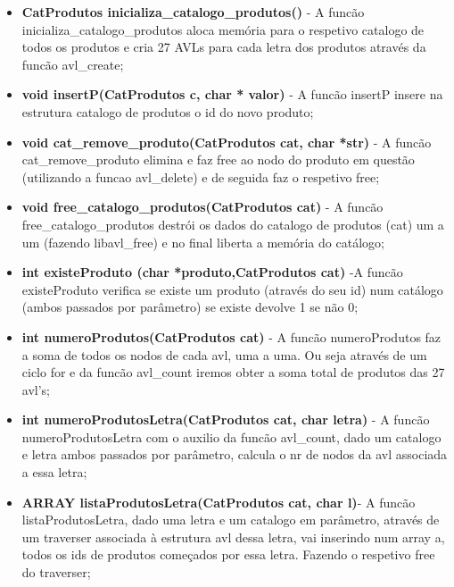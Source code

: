\begin{itemize}
	
\item \textbf{CatProdutos inicializa\_catalogo\_produtos()} - A funcão inicializa\_catalogo\_produtos aloca memória para o respetivo catalogo de todos os produtos e cria 27 AVLs para cada letra dos produtos através da funcão avl\_create; 

\item \textbf{void insertP(CatProdutos c, char * valor)} - A funcão insertP insere na estrutura catalogo de produtos o id do novo produto; 

\item \textbf{void cat\_remove\_produto(CatProdutos cat, char *str)} - A funcão cat\_remove\_produto elimina e faz free ao nodo do produto em questão (utilizando a funcao avl\_delete) e de seguida faz o respetivo free; 

\item \textbf{void free\_catalogo\_produtos(CatProdutos cat)} - A funcão free\_catalogo\_produtos destrói os dados do catalogo de produtos (cat) um a um (fazendo libavl\_free) e no final liberta  a memória do catálogo; 

\item \textbf{int existeProduto (char *produto,CatProdutos cat)}  -A funcão existeProduto verifica se existe um produto (através do seu id) num catálogo (ambos passados por parâmetro) se  existe devolve 1 se não 0; 

\item \textbf{int numeroProdutos(CatProdutos cat)} - A funcão numeroProdutos faz a soma de todos os nodos de cada avl, uma a uma. Ou seja através de um ciclo for e da funcão avl\_count iremos obter a soma total de produtos das 27 avl's; 

\item \textbf{int numeroProdutosLetra(CatProdutos cat, char letra)} - A funcão numeroProdutosLetra com o auxilio da funcão avl\_count, dado um catalogo e letra ambos passados por parâmetro, calcula o nr de nodos da avl associada a essa letra; 

\item \textbf{ARRAY listaProdutosLetra(CatProdutos cat, char l)}- A funcão listaProdutosLetra, dado uma letra e um catalogo em parâmetro, através de um traverser 
associada à estrutura avl dessa letra, vai inserindo num array a, todos os ids de produtos começados por essa letra. Fazendo o respetivo free do traverser; 
\end{itemize}


